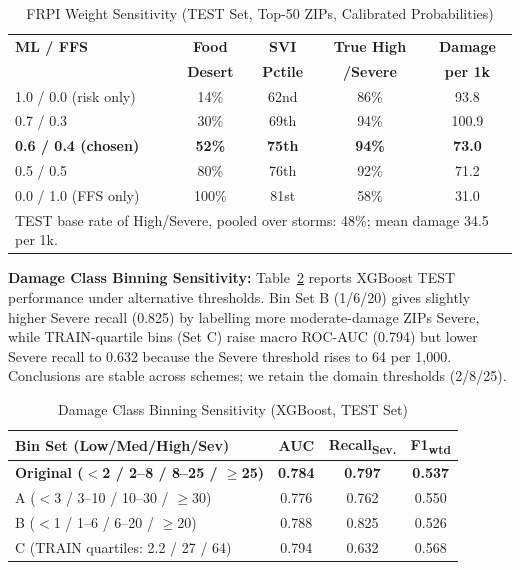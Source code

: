 \documentclass[conference]{IEEEtran}
\renewcommand{\_}{\origunderscore\allowbreak}
\begin{document}
\begin{table}[htbp]
\caption{FRPI Weight Sensitivity (TEST Set, Top-50 ZIPs,
Calibrated Probabilities)}
\label{tab:frpi_sens}
\centering
\small
\setlength{\tabcolsep}{4pt}
\begin{tabular}{lcccc}
\toprule
\textbf{ML / FFS} & \textbf{Food} & \textbf{SVI} &
\textbf{True High} & \textbf{Damage} \\
 & \textbf{Desert} & \textbf{Pctile} & \textbf{/Severe} &
\textbf{per 1k} \\
\midrule
1.0 / 0.0 (risk only)  & 14\%  & 62nd & 86\% & 93.8 \\
0.7 / 0.3              & 30\%  & 69th & 94\% & 100.9 \\
\textbf{0.6 / 0.4 (chosen)} & \textbf{52\%} & \textbf{75th} & \textbf{94\%} & \textbf{73.0} \\
0.5 / 0.5              & 80\%  & 76th & 92\% & 71.2 \\
0.0 / 1.0 (FFS only)   & 100\% & 81st & 58\% & 31.0 \\
\bottomrule
\multicolumn{5}{p{0.94\columnwidth}}{\footnotesize TEST base rate of High/Severe, pooled over storms: 48\%; mean damage 34.5 per 1k.}\\
\end{tabular}
\end{table}

\textbf{Damage Class Binning Sensitivity:}
Table~\ref{tab:bin_sens} reports XGBoost TEST performance under
alternative thresholds. Bin Set B (1/6/20) gives slightly higher
Severe recall (0.825) by labelling more moderate-damage ZIPs
Severe, while TRAIN-quartile bins (Set C) raise macro ROC-AUC
(0.794) but lower Severe recall to 0.632 because the Severe
threshold rises to 64 per 1,000. Conclusions are stable across
schemes; we retain the domain thresholds (2/8/25).

\begin{table}[htbp]
\caption{Damage Class Binning Sensitivity (XGBoost, TEST Set)}
\label{tab:bin_sens}
\centering
\small
\setlength{\tabcolsep}{4pt}
\begin{tabular}{lccc}
\toprule
\textbf{Bin Set (Low/Med/High/Sev)} & \textbf{AUC} &
\textbf{Recall\textsubscript{Sev.}} & \textbf{F1\textsubscript{wtd}} \\
\midrule
\textbf{Original ($<$2 / 2--8 / 8--25 / $\geq$25)} & \textbf{0.784} & \textbf{0.797} & \textbf{0.537} \\
A ($<$3 / 3--10 / 10--30 / $\geq$30)      & 0.776 & 0.762 & 0.550 \\
B ($<$1 / 1--6 / 6--20 / $\geq$20)        & 0.788 & 0.825 & 0.526 \\
C (TRAIN quartiles: 2.2 / 27 / 64)        & 0.794 & 0.632 & 0.568 \\
\bottomrule
\end{tabular}
\end{table}
\end{document}
